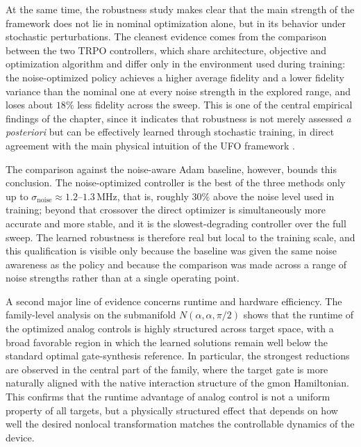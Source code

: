 At the same time, the robustness study makes clear that the main strength of the framework does not lie in nominal optimization alone, but in its behavior under stochastic perturbations. The cleanest evidence comes from the comparison between the two TRPO controllers, which share architecture, objective and optimization algorithm and differ only in the environment used during training: the noise-optimized policy achieves a higher average fidelity and a lower fidelity variance than the nominal one at every noise strength in the explored range, and loses about \(18\%\) less fidelity across the sweep. This is one of the central empirical findings of the chapter, since it indicates that robustness is not merely assessed \emph{a posteriori} but can be effectively learned through stochastic training, in direct agreement with the main physical intuition of the UFO framework \cite{Niu2019}.

The comparison against the noise-aware Adam baseline, however, bounds this conclusion. The noise-optimized controller is the best of the three methods only up to \(\sigma_{\mathrm{noise}}\approx1.2\)--\(1.3\,\mathrm{MHz}\), that is, roughly \(30\%\) above the noise level used in training; beyond that crossover the direct optimizer is simultaneously more accurate and more stable, and it is the slowest-degrading controller over the full sweep. The learned robustness is therefore real but local to the training scale, and this qualification is visible only because the baseline was given the same noise awareness as the policy and because the comparison was made across a range of noise strengths rather than at a single operating point.

A second major line of evidence concerns runtime and hardware efficiency. The family-level analysis on the submanifold \(N(\alpha,\alpha,\pi/2)\) shows that the runtime of the optimized analog controls is highly structured across target space, with a broad favorable region in which the learned solutions remain well below the standard optimal gate-synthesis reference. In particular, the strongest reductions are observed in the central part of the family, where the target gate is more naturally aligned with the native interaction structure of the gmon Hamiltonian. This confirms that the runtime advantage of analog control is not a uniform property of all targets, but a physically structured effect that depends on how well the desired nonlocal transformation matches the controllable dynamics of the device.

